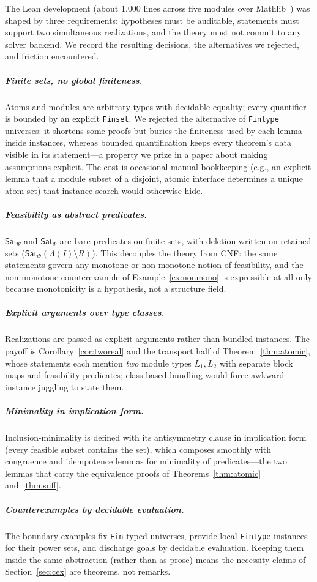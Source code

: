 \documentclass[sigplan,10pt,review,anonymous]{acmart}
\theoremstyle{acmdefinition}
\newcommand{\code}[1]{\texttt{#1}}
\newcommand{\Lam}{\Lambda}
\newcommand{\SatPsi}{{\mathsf{Sat}_\Psi}}
\newcommand{\SatPhi}{{\mathsf{Sat}_\Phi}}
\begin{document}
The Lean development (about 1{,}000 lines across five modules over
Mathlib~\cite{mathlib2020}) was shaped by three requirements: hypotheses must
be auditable, statements must support two simultaneous realizations, and the
theory must not commit to any solver backend. We record the resulting
decisions, the alternatives we rejected, and friction encountered.

\subparagraph*{Finite sets, no global finiteness.} Atoms and modules are
arbitrary types with decidable equality; every quantifier is bounded by an
explicit \code{Finset}. We rejected the alternative of \code{Fintype}
universes: it shortens some proofs but buries the finiteness used by each
lemma inside instances, whereas bounded quantification keeps every theorem's
data visible in its statement---a property we prize in a paper about making
assumptions explicit. The cost is occasional manual bookkeeping
(e.g., an explicit lemma that a module subset of a disjoint, atomic interface
determines a unique atom set) that instance search would otherwise hide.

\subparagraph*{Feasibility as abstract predicates.} $\SatPsi$ and $\SatPhi$
are bare predicates on finite sets, with deletion written on retained sets
($\SatPhi(\Lam(I)\setminus R)$). This decouples the theory from CNF: the same
statements govern any monotone or non-monotone notion of feasibility, and the
non-monotone counterexample of Example~\ref{ex:nonmono} is expressible at
all only because monotonicity is a hypothesis, not a structure field.

\subparagraph*{Explicit arguments over type classes.} Realizations are passed
as explicit arguments rather than bundled instances. The payoff is
Corollary~\ref{cor:tworeal} and the transport half of
Theorem~\ref{thm:atomic}, whose statements each mention \emph{two} module
types $L_1, L_2$ with separate block maps and feasibility predicates;
class-based bundling would force awkward instance juggling to state them.

\subparagraph*{Minimality in implication form.} Inclusion-minimality is
defined with its antisymmetry clause in implication form (every feasible
subset contains the set), which composes smoothly with congruence and
idempotence lemmas for minimality of predicates---the two lemmas that carry
the equivalence proofs of Theorems~\ref{thm:atomic} and~\ref{thm:suff}.

\subparagraph*{Counterexamples by decidable evaluation.} The boundary
examples fix \code{Fin}-typed universes, provide local \code{Fintype}
instances for their power sets, and discharge goals by decidable evaluation.
Keeping them inside the same abstraction (rather than as prose) means the
necessity claims of Section~\ref{sec:cex} are theorems, not remarks.
\end{document}
